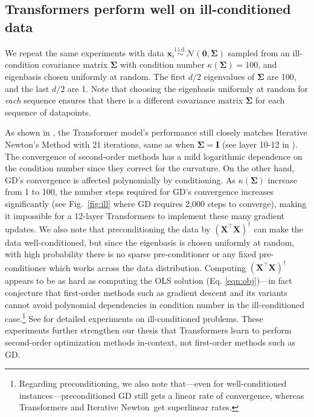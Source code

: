 \documentclass[11pt]{article}
\theoremstyle{plain}
\theoremstyle{definition}
\theoremstyle{remark}
\newcommand{\zero}{\boldsymbol{0}}
\renewcommand{\^}[1]{^{(#1)}}
\newcommand{\bx}{\boldsymbol{x}}
\newcommand{\bX}{\boldsymbol{X}}
\newcommand{\bI}{\boldsymbol{I}}
\newcommand{\bSigma}{\boldsymbol{\Sigma}}
\newcommand{\newton}{Iterative Newton}
\newcommand{\iid}{\overset{\text{i.i.d.}}{\sim}}
\begin{document}
\vspace{-1mm}
\subsection{Transformers perform well on ill-conditioned data}  \label{ssec:ill}
\vspace{-1mm}

\vspace{-1mm}

We repeat the same experiments with data $\bx_i \iid \mathcal N(\zero, \bSigma)$ sampled from an ill-condition covariance matrix $\bSigma$ with condition number $\kappa(\bSigma) = 100$, and eigenbasis chosen uniformly at random.  The first $d/2$ eigenvalues of $\bSigma$  are 100, and the last $d/2$ are 1. Note that choosing the eigenbasis uniformly at random for \emph{each} sequence ensures that there is a different covariance matrix $\bSigma$ for {each} sequence of datapoints.

As shown in , the Transformer model's performance still closely matches \newton's Method with 21 iterations, same as when $\bSigma = \bI$ (see layer 10-12 in ). The convergence of second-order methods has a mild logarithmic dependence on the condition number since they correct for the curvature. On the other hand, GD's convergence is affected polynomially by conditioning.  
As $\kappa(\bSigma)$ increase from 1 to 100, the number steps required for GD's convergence increases significantly (see Fig.~\ref{fig:ill} where GD requires 2,000 steps to converge), making it impossible for a 12-layer Transformers to implement these many gradient updates.  We also note that preconditioning the data by $(\bX^\top \bX)^\dagger$ can make the data well-conditioned, but since the eigenbasis is chosen uniformly at random, with high probability there is no sparse pre-conditioner or any fixed pre-conditioner which works across the data distribution. Computing $(\bX^\top \bX)^\dagger$ appears to be as hard as computing the OLS solution (Eq. \ref{eqn:obj})---in fact \citet{sharan2019memory} conjecture that first-order methods such as gradient descent and its variants cannot avoid polynomial dependencies in condition number in the ill-conditioned case.\footnote{Regarding preconditioning, we also note that---even for well-conditioned instances---preconditioned GD still gets a linear rate of convergence, whereas Transformers and \newton\ get superlinear rates.} 
See  for detailed experiments on ill-conditioned problems. These experiments further strengthen our thesis that Transformers learn to perform second-order optimization methods in-context, not first-order methods such as GD. 
\end{document}
